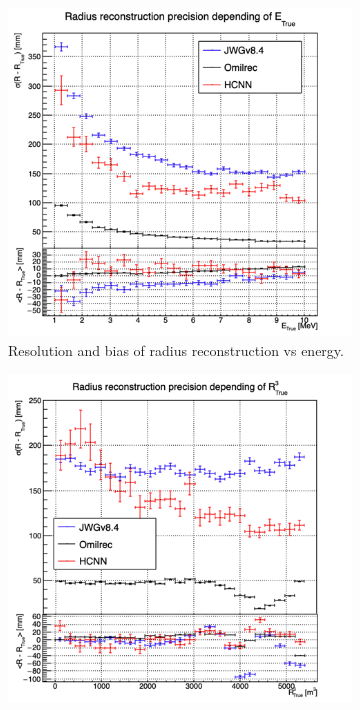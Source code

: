 \documentclass[../main.tex]{subfiles}
\begin{document}
\begin{figure}[ht]
  \centering
  \begin{subfigure}[t]{0.48\linewidth}
    \centering
    \includegraphics[width=\linewidth]{images/jgnn/hcnn/MSBvETC.png}
    \caption{Resolution and bias of radius reconstruction vs energy.}
    \label{fig:jgnn:MSBvETC_hcnn}
  \end{subfigure}
  \begin{subfigure}[t]{0.48\linewidth}
    \centering
    \includegraphics[width=\linewidth]{images/jgnn/hcnn/MSBvRTC.png}

\end{subfigure}
\end{figure}
\end{document}
